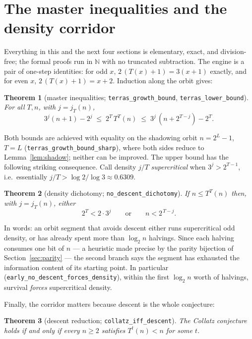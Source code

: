 \documentclass[11pt]{article}
\newtheorem{theorem}{Theorem}[section]
\newcommand{\N}{\mathbb{N}}
\newcommand{\code}[1]{\texttt{#1}}
\newcommand{\jodd}[2]{j_{#1}(#2)}
\begin{document}
\section{The master inequalities and the density corridor}
\label{sec:corridor}

Everything in this and the next four sections is elementary, exact, and
division-free; the formal proofs run in $\N$ with no truncated
subtraction. The engine is a pair of one-step identities: for odd $x$,
$2\,(T(x)+1) = 3(x+1)$ exactly, and for even $x$, $2\,(T(x)+1) = x+2$.
Induction along the orbit gives:

\begin{theorem}[master inequalities;
\code{terras\_growth\_bound}, \code{terras\_lower\_bound}]
\label{thm:master}
For all $T, n$, with $j = \jodd{T}{n}$,
\[
3^j (n+1) - 2^j \;\le\; 2^T\, T^T(n) \;\le\; 3^j\,(n + 2^{T-j}) - 2^T .
\]
\end{theorem}

Both bounds are achieved with equality on the shadowing orbit
$n = 2^L-1$, $T = L$ (\code{terras\_growth\_bound\_sharp}), where both
sides reduce to Lemma~\ref{lem:shadow}; neither can be improved.
The upper bound has the following striking consequence. Call density
$j/T$ \emph{supercritical} when $3^j > 2^{T-1}$, i.e.\ essentially
$j/T > \log 2/\log 3 \approx 0.6309$.

\begin{theorem}[density dichotomy; \code{no\_descent\_dichotomy}]
\label{thm:dichotomy}
If $n \le T^T(n)$ then, with $j = \jodd{T}{n}$, either
\[
2^T < 2 \cdot 3^{j}
\qquad\text{or}\qquad
n < 2^{\,T - j}.
\]
\end{theorem}

In words: an orbit segment that avoids descent either runs
supercritical odd density, or has already spent more than $\log_2 n$
halvings. Since each halving consumes one bit of $n$ --- a heuristic
made precise by the parity bijection of Section~\ref{sec:parity} ---
the second branch says the segment has exhausted the information
content of its starting point. In particular
(\code{early\_no\_descent\_forces\_density}), within the first
$\log_2 n$ worth of halvings, survival \emph{forces} supercritical
density.

Finally, the corridor matters because descent is the whole conjecture:

\begin{theorem}[descent reduction; \code{collatz\_iff\_descent}]
\label{thm:reduction}
The Collatz conjecture holds if and only if every $n \ge 2$ satisfies
$T^t(n) < n$ for some $t$.
\end{theorem}
\end{document}

